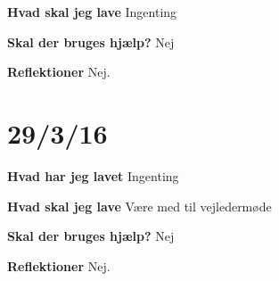 \documentclass{article}
\begin{document}
	\textbf{Hvad skal jeg lave}
	Ingenting

	\textbf{Skal der bruges hjælp?}
	Nej
	
	\textbf{Reflektioner}
	Nej.
	
	\section{29/3/16}
	\textbf{Hvad har jeg lavet}
	Ingenting
	
	\textbf{Hvad skal jeg lave}
	Være med til vejledermøde
	
	\textbf{Skal der bruges hjælp?}
	Nej
	
	\textbf{Reflektioner}
	Nej.
	
	
\end{document}

